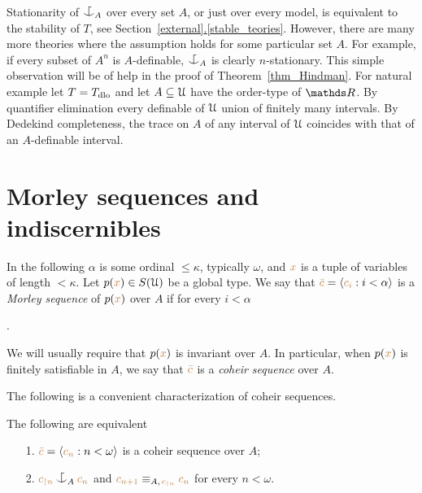 \documentclass[creche.tex]{subfiles}
\begin{document}

\begin{remark}\label{rk_coheir_stationary}
Stationarity of $\nonforkc_A$ over every set $A$, or just over every model, is equivalent to the stability of $T$, see Section~\hyperref[stable_teories]{\ref*{external}.\ref*{stable_teories}}.
However, there are many more theories where the assumption holds for some particular set $A$.
For example, if every subset of $A^n$ is $A$-definable, $\nonforkc_A$ is clearly $n$-stationary.
This simple observation will be of help in the proof of Theorem~\ref{thm_Hindman}.
For natural example let $T=T_{\rm dlo}$ and let $A\subseteq\EuScript U$ have the order-type of $\RR$.
By quantifier elimination every definable of $\EuScript U$ union of finitely many intervals.
By Dedekind completeness, the trace on $A$ of any interval of $\EuScript U$ coincides with that of an $A$-definable interval. 
\end{remark}

\section{Morley sequences and indiscernibles}


In the following $\alpha$ is some ordinal $\le\kappa$, typically $\omega$, and ${\color{brown} x}$ is a tuple of variables of length $<\kappa$.
Let \mbox{$p({\color{brown} x})\in S(\EuScript U)$} be a global type.
We say that ${\color{brown}\bar c}=\langle{\color{brown}c_i}:i<\alpha\rangle$ is a \emph{Morley sequence\/} of $p({\color{brown} x})$ over $A$ if for every $i<\alpha$

.

We will usually require that $p({\color{brown} x})$ is invariant over $A$.
In particular, when $p({\color{brown} x})$ is finitely satisfiable in $A$, we say that ${\color{brown}\bar c}$ is a \emph{coheir sequence\/} over $A$.

The following is a convenient characterization of coheir sequences.

\begin{lemma}\label{lem_coheir_property}
The following are equivalent
\begin{itemize}
\item[1.] ${\color{brown}\bar c}=\langle{\color{brown}c_n}:n<\omega\rangle$ is a coheir sequence over $A$;
\item[2.] ${\mr c_{\restriction n}}\nonforkc_A{\mr c_n}$ and ${\color{brown} c_{n+1}}\equiv_{A,\,{\color{brown} c_{\restriction n}}}{\color{brown} c_n}$ for every $n<\omega$.
\end{itemize}
\end{lemma}
\end{document}
